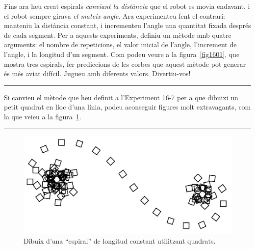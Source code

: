 \begin{center}
\colorbox{black}{}
\end{center}
{\small
\noindent
Fins ara heu creat espirals \emph{canviant la distància} que el robot es movia endavant, i el robot sempre girava \emph{el mateix angle}. Ara experimenteu fent el contrari: manteniu la distància constant, i incrementeu l'angle una quantitat fixada després de cada segment. Per a aquests experiments, definiu un mètode amb quatre arguments: el nombre de repeticions, el valor inicial de l'angle, l'increment de l'angle, i la longitud d'un segment. Com podeu veure a la figura~\ref{fig1601}, que mostra tres espirals, fer prediccions de les corbes que aquest mètode pot generar és més aviat difícil. Jugueu amb diferents valors. Divertiu-vos!}\\
\noindent
\rule{\textwidth}{3pt}

\newpage

\begin{center}
\colorbox{black}{}
\end{center}
{\small
\noindent
Si canvieu el mètode que heu definit a l'Experiment 16-7 per a que dibuixi un petit quadrat en lloc d'una línia, podeu aconseguir figures molt extravagants, com la que veieu a la figura~\ref{fig1602}.}\\
\noindent
\rule{\textwidth}{3pt}

\begin{figure}[h]
\begin{center}
\includegraphics[scale=0.1]{Imatges/figura16-2.jpg}
\end{center}
\caption{Dibuix d'una ``espiral'' de longitud constant utilitzant quadrats.}
\label{fig1602}
\end{figure}

